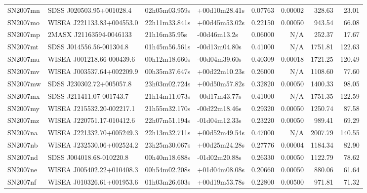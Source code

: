 \begin{longtable}{llllrrrr}
SN2007mn         &        SDSS J020503.95+001028.4 &   02h05m03.959s &   +00d10m28.41s &  0.07763 &  0.00002 &   328.63 &       23.01 \\
SN2007mo         &       WISEA J221133.83+004553.0 &   22h11m33.841s &   +00d45m53.02s &  0.22150 &  0.00050 &   943.54 &       66.08 \\
SN2007mp         &         2MASX J21163594-0046133 &    21h16m35.95s &    -00d46m13.2s &  0.06000 &      N/A &   252.37 &       17.67 \\
SN2007mt         &        SDSS J014556.56-001304.8 &   01h45m56.561s &   -00d13m04.80s &  0.41000 &      N/A &  1751.81 &      122.63 \\
SN2007mu         &       WISEA J001218.66-000439.6 &   00h12m18.660s &   -00d04m39.60s &  0.40309 &  0.00018 &  1721.25 &      120.49 \\
SN2007mv         &       WISEA J003537.64+002209.9 &   00h35m37.647s &   +00d22m10.23s &  0.26000 &      N/A &  1108.60 &       77.60 \\
SN2007mw         &        SDSS J230302.72+005057.8 &   23h03m02.724s &   +00d50m57.82s &  0.32820 &  0.00050 &  1400.33 &       98.05 \\
SN2007mx         &        SDSS J211411.07-001743.7 &   21h14m11.073s &   -00d17m43.77s &  0.41000 &      N/A &  1751.35 &      122.59 \\
SN2007my         &       WISEA J215532.20-002217.1 &   21h55m32.170s &   -00d22m18.46s &  0.29320 &  0.00050 &  1250.74 &       87.58 \\
SN2007mz         &       WISEA J220751.17-010412.6 &   22h07m51.194s &   -01d04m12.33s &  0.23220 &  0.00050 &   989.41 &       69.29 \\
SN2007na         &       WISEA J221332.70+005249.3 &   22h13m32.711s &   +00d52m49.54s &  0.47000 &      N/A &  2007.79 &      140.55 \\
SN2007nb         &       WISEA J232530.06+002524.2 &   23h25m30.067s &   +00d25m24.28s &  0.27776 &  0.00004 &  1184.34 &       82.90 \\
SN2007nd         &        SDSS J004018.68-010220.8 &   00h40m18.688s &   -01d02m20.88s &  0.26330 &  0.00050 &  1122.79 &       78.62 \\
SN2007ne         &       WISEA J005402.22+010408.3 &   00h54m02.208s &   +01d04m08.08s &  0.20660 &  0.00050 &   880.06 &       61.64 \\
SN2007nf         &       WISEA J010326.61+001953.6 &   01h03m26.603s &   +00d19m53.78s &  0.22800 &  0.00500 &   971.81 &       71.32 \\

\end{longtable}
